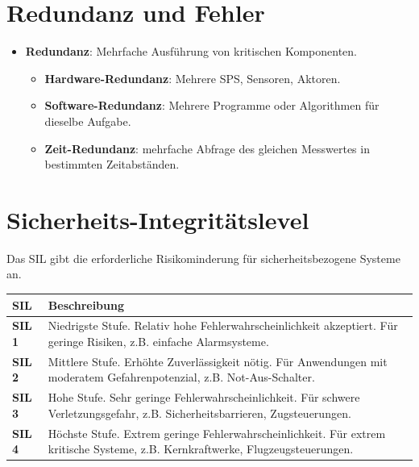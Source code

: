 \documentclass[9pt, landscape]{article}
\newcommand{\algo}[1]{\textbf{\textcolor{blue!60!black}{#1}}}
\newcommand{\datastruct}[1]{\textbf{\textcolor{red!60!black}{#1}}}
\begin{document}
\begin{multicols*}{4}
\section{Redundanz und Fehler}

\begin{itemize}
\item \algo{Redundanz}: Mehrfache Ausführung von kritischen Komponenten.
\begin{itemize}
    \item \datastruct{Hardware-Redundanz}: Mehrere SPS, Sensoren, Aktoren.
    \item \datastruct{Software-Redundanz}: Mehrere Programme oder Algorithmen für dieselbe Aufgabe.
    \item \datastruct{Zeit-Redundanz}: mehrfache Abfrage des gleichen Messwertes in bestimmten Zeitabständen.
\end{itemize}

\end{itemize}

\section{Sicherheits-Integritätslevel}
Das SIL gibt die erforderliche Risikominderung für sicherheitsbezogene Systeme an.

\noindent
\begin{tabularx}{\linewidth}{l >{\RaggedRight}X}
\toprule
\textbf{SIL} & \textbf{Beschreibung}  \\
\midrule
\textbf{SIL 1} & Niedrigste Stufe. Relativ hohe Fehlerwahrscheinlichkeit akzeptiert. Für geringe Risiken, z.B. einfache Alarmsysteme. \\
\textbf{SIL 2} & Mittlere Stufe. Erhöhte Zuverlässigkeit nötig. Für Anwendungen mit moderatem Gefahrenpotenzial, z.B. Not-Aus-Schalter. \\
\textbf{SIL 3} & Hohe Stufe. Sehr geringe Fehlerwahrscheinlichkeit. Für schwere Verletzungsgefahr, z.B. Sicherheitsbarrieren, Zugsteuerungen. \\
\textbf{SIL 4} & Höchste Stufe. Extrem geringe Fehlerwahrscheinlichkeit. Für extrem kritische Systeme, z.B. Kernkraftwerke, Flugzeugsteuerungen. \\
\bottomrule
\end{tabularx}


\end{multicols*}
\end{document}

